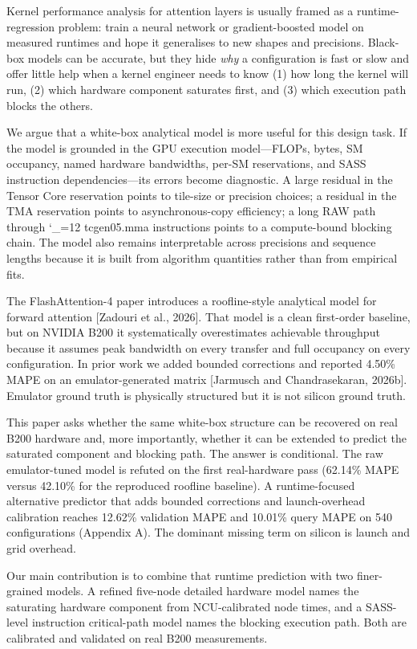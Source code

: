 \documentclass[
  10pt,journal,compsoc,twoside]{IEEEtran}
\renewcommand{\texttt}[1]{%
  \begingroup
  \ttfamily
  \catcode`_=12
  \def\_{\char`\_\allowbreak}%
  #1%
  \endgroup
}
\begin{document}
Kernel performance analysis for attention layers is usually framed as a
runtime-regression problem: train a neural network or gradient-boosted
model on measured runtimes and hope it generalises to new shapes and
precisions. Black-box models can be accurate, but they hide \emph{why} a
configuration is fast or slow and offer little help when a kernel
engineer needs to know (1) how long the kernel will run, (2) which
hardware component saturates first, and (3) which execution path blocks
the others.

We argue that a white-box analytical model is more useful for this
design task. If the model is grounded in the GPU execution
model---FLOPs, bytes, SM occupancy, named hardware bandwidths, per-SM
reservations, and SASS instruction dependencies---its errors become
diagnostic. A large residual in the Tensor Core reservation points to
tile-size or precision choices; a residual in the TMA reservation points
to asynchronous-copy efficiency; a long RAW path through
\texttt{tcgen05.mma} instructions points to a compute-bound blocking
chain. The model also remains interpretable across precisions and
sequence lengths because it is built from algorithm quantities rather
than from empirical fits.

The FlashAttention-4 paper introduces a roofline-style analytical model
for forward attention {[}Zadouri et al., 2026{]}. That model is a clean
first-order baseline, but on NVIDIA B200 it systematically overestimates
achievable throughput because it assumes peak bandwidth on every
transfer and full occupancy on every configuration. In prior work we
added bounded corrections and reported 4.50\% MAPE on an
emulator-generated matrix {[}Jarmusch and Chandrasekaran, 2026b{]}.
Emulator ground truth is physically structured but it is not silicon
ground truth.

This paper asks whether the same white-box structure can be recovered on
real B200 hardware and, more importantly, whether it can be extended to
predict the saturated component and blocking path. The answer is
conditional. The raw emulator-tuned model is refuted on the first
real-hardware pass (62.14\% MAPE versus 42.10\% for the reproduced
roofline baseline). A runtime-focused alternative predictor that adds
bounded corrections and launch-overhead calibration reaches 12.62\%
validation MAPE and 10.01\% query MAPE on 540 configurations (Appendix
A). The dominant missing term on silicon is launch and grid overhead.

Our main contribution is to combine that runtime prediction with two
finer-grained models. A refined five-node detailed hardware model names
the saturating hardware component from NCU-calibrated node times, and a
SASS-level instruction critical-path model names the blocking execution
path. Both are calibrated and validated on real B200 measurements.
\end{document}
